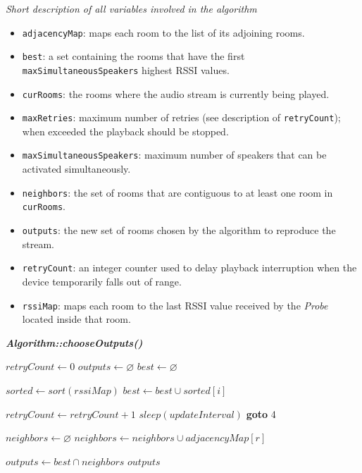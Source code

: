 \documentclass{IEEEtran}
\newcommand{\Probe}{\textsl{Probe}}
\begin{document}
\textit{Short description of all variables involved in the algorithm}
\begin{itemize}
\item \texttt{adjacencyMap}: maps each room to the list of its adjoining rooms.
\item \texttt{best}: a set containing the rooms that have the first \texttt{maxSimultaneousSpeakers} highest RSSI values.
\item \texttt{curRooms}: the rooms where the audio stream is currently being played.
\item \texttt{maxRetries}: maximum number of retries (see description of \texttt{retryCount}); when exceeded the playback should be stopped.
\item \texttt{maxSimultaneousSpeakers}: maximum number of speakers that can be activated simultaneously.
\item \texttt{neighbors}: the set of rooms that are contiguous to at least one room in \texttt{curRooms}.
\item \texttt{outputs}: the new set of rooms chosen by the algorithm to reproduce the stream.
\item \texttt{retryCount}: an integer counter used to delay playback interruption when the device temporarily falls out of range.
\item \texttt{rssiMap}: maps each room to the last RSSI value received by the \Probe{} located inside that room.
\end{itemize}

\vspace{3mm}

\textbf{\textit{Algorithm::chooseOutputs()}}
\begin{algorithmic}[1]
\STATE $retryCount \gets 0$
\STATE $outputs \gets \varnothing$
\STATE $best \gets \varnothing$

\STATE $sorted \gets sort(rssiMap)$
	\STATE $best \gets best \cup sorted[i]$
\ENDFOR

	\STATE $retryCount \gets retryCount + 1$
	\STATE $sleep(updateInterval)$
	\STATE \textbf{goto} 4
\ENDIF

\STATE $neighbors \gets \varnothing$
	\STATE $neighbors \gets neighbors \cup adjacencyMap[r]$
\ENDFOR

\STATE $outputs \gets best \cap neighbors$
\RETURN $outputs$
\end{algorithmic}
\end{document}

